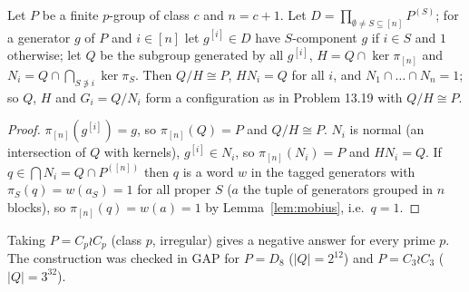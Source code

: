 \begin{theorem}\label{thm:1319gen}
Let $P$ be a finite $p$-group of class $c$ and $n=c+1$. Let $D=\prod_{\emptyset\ne S\subseteq[n]}P^{(S)}$; for a
generator $g$ of $P$ and $i\in[n]$ let $g^{[i]}\in D$ have $S$-component $g$ if $i\in S$ and $1$ otherwise; let $Q$ be
the subgroup generated by all $g^{[i]}$, $H=Q\cap\ker\pi_{[n]}$ and $N_i=Q\cap\bigcap_{S\not\ni i}\ker\pi_S$. Then
$Q/H\cong P$, $HN_i=Q$ for all $i$, and $N_1\cap\dots\cap N_n=1$; so $Q$, $H$ and $G_i=Q/N_i$ form a configuration
as in Problem 13.19 with $Q/H\cong P$.
\end{theorem}
\begin{proof}
$\pi_{[n]}(g^{[i]})=g$, so $\pi_{[n]}(Q)=P$ and $Q/H\cong P$. $N_i$ is normal (an intersection of $Q$ with kernels),
$g^{[i]}\in N_i$, so $\pi_{[n]}(N_i)=P$ and $HN_i=Q$. If $q\in\bigcap N_i=Q\cap P^{([n])}$ then $q$ is a word $w$ in
the tagged generators with $\pi_S(q)=w(a_S)=1$ for all proper $S$ ($a$ the tuple of generators grouped in $n$
blocks), so $\pi_{[n]}(q)=w(a)=1$ by Lemma~\ref{lem:mobius}, i.e.\ $q=1$.
\end{proof}
Taking $P=C_p\wr C_p$ (class $p$, irregular) gives a negative answer for every prime $p$. The construction was
checked in GAP for $P=D_8$ ($|Q|=2^{12}$) and $P=C_3\wr C_3$ ($|Q|=3^{32}$).
